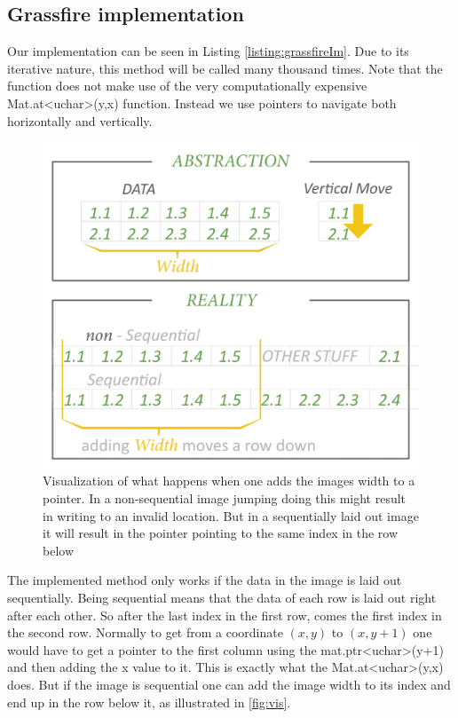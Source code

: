 \subsection{Grassfire implementation}
Our implementation can be seen in Listing \ref{listing:grassfireIm}. Due to its iterative nature, this method will be called many thousand times. Note that the function does not make use of the very computationally expensive Mat.at<uchar>(y,x) function. Instead we use pointers to navigate both horizontally and vertically.
\begin{figure}[H]
	\centering
	\includegraphics[width=0.6\linewidth]{figure/Analysis/data.png}
	\caption{Visualization of what happens when one adds the images width to a pointer. In a non-sequential image jumping doing this might result in writing to an invalid location. But in a sequentially laid out image it will result in the pointer pointing to the same index in the row below } 
	\label{fig:vis}
\end{figure}
 The implemented method only works if the data in the image is laid out sequentially. Being sequential means that the data of each row is laid out right after each other. So after the last index in the first row, comes the first index in the second row. Normally to get from a coordinate $(x,y)$ to $(x,y+1)$ one would have to get a pointer to the first column using the mat.ptr<uchar>(y+1) and then adding the x value to it. This is exactly what the Mat.at<uchar>(y,x) does. But if the image is sequential one can add the image width to its index and end up in the row below it, as illustrated in \autoref{fig:vis}.\\
 
